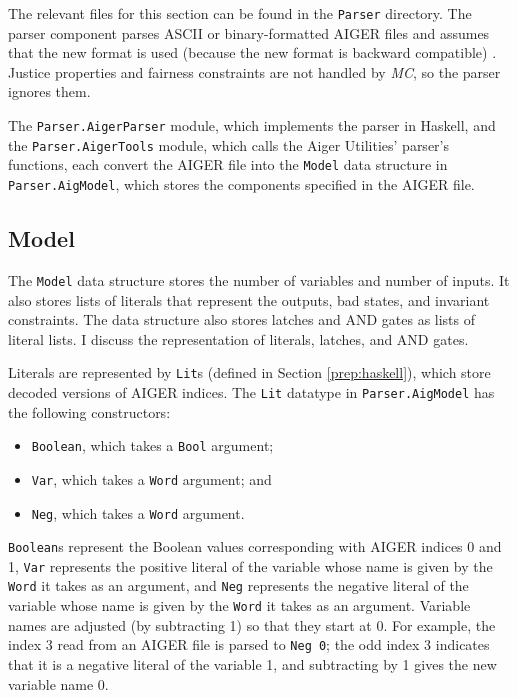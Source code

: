 \documentclass[12pt,a4paper,twoside,openright]{report}
\begin{document}
{The relevant files for this section can be found in the \verb,Parser, directory.
The parser component parses ASCII or binary-formatted AIGER files and
assumes that the new format is used (because the new format is backward compatible)
. Justice properties and fairness constraints are not handled by \emph{MC}, so
the parser ignores them.

The \verb,Parser.AigerParser, module, which implements the parser in Haskell, and
the \verb,Parser.AigerTools, module, which calls the Aiger Utilities' parser's functions,
each convert the AIGER file into the \verb,Model, data structure in \verb,Parser.AigModel,,
which stores the components specified in the AIGER file.

\subsection{Model}

The \verb,Model, data structure stores the number of variables and
number of inputs. It also stores lists of literals that represent the outputs, bad states,
and invariant constraints. The data structure also stores latches and AND gates as
lists of literal lists. I discuss the representation of literals, latches, and
AND gates.

Literals are represented by \verb,Lit,s (defined in Section \ref{prep:haskell}),
which store decoded versions of AIGER indices. The {\tt Lit} datatype
in {\tt Parser.AigModel} has the following constructors:
\begin{itemize}
\item \verb,Boolean,, which takes a \verb,Bool, argument;
\item \verb,Var,, which takes a \verb,Word, argument; and
\item \verb,Neg,, which takes a \verb,Word, argument.
\end{itemize}
\verb,Boolean,s represent the Boolean values corresponding with AIGER indices 0 and 1,
\verb,Var, represents the positive literal of the variable whose name is given by the
\verb,Word, it takes as an argument, and \verb,Neg, represents the negative literal
of the variable whose name is given by the \verb,Word, it takes as an argument.
Variable names are adjusted (by subtracting 1) so that they start at 0.
For example, the index 3 read from an AIGER file is parsed to \verb,Neg 0,;
the odd index 3 indicates that it is a negative literal of the variable 1, and
subtracting by 1 gives the new variable name 0.

}
\end{document}
